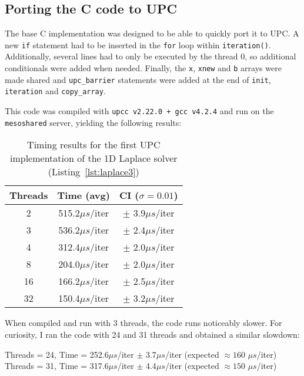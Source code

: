 \documentclass[12pt]{article}
\newcommand{\us}[0]{${\mu}s$}
\begin{document}


\subsection{Porting the C code to UPC}

The base C implementation was designed to be able to quickly port it to UPC.
A new \texttt{if} statement had to be inserted in the \texttt{for} loop within \texttt{iteration()}.
Additionally, several lines had to only be executed by the thread 0, so additional conditionals were added when needed.
Finally, the \texttt{x}, \texttt{xnew} and \texttt{b} arrays were made shared and \texttt{upc\_barrier} statements were added at the end of \texttt{init}, \texttt{iteration} and \texttt{copy\_array}.

This code was compiled with \texttt{upcc v2.22.0 + gcc v4.2.4} and run on the \texttt{mesoshared} server, yielding the following results:

\begin{table}[h]
  \centering\begin{tabular}{|c|c|c|}
    \hline
    Threads & Time (avg) & CI ($\sigma=0.01$) \\
    \hline
    2 & 515.2\us/iter & $\pm$ 3.9\us/iter \\
    3 & 536.2\us/iter & $\pm$ 2.4\us/iter \\
    4 & 312.4\us/iter & $\pm$ 2.0\us/iter \\
    8 & 204.0\us/iter & $\pm$ 2.0\us/iter \\
    16 & 166.2\us/iter & $\pm$ 2.5\us/iter \\
    32 & 150.4\us/iter & $\pm$ 3.2\us/iter \\
    \hline
  \end{tabular}
  \caption{Timing results for the first UPC implementation of the 1D Laplace solver (Listing~\ref{lst:laplace3})}
  \label{tab:laplace3}
\end{table}

When compiled and run with 3 threads, the code runs noticeably slower. For curiosity, I ran the code with 24 and 31 threads and obtained a similar slowdown:

\begin{center}
  Threads = 24, \quad Time = 252.6\us/iter $\pm$ 3.7\us/iter \enspace (expected $\approx 160$ \us/iter) \\
  Threads = 31, \quad Time = 317.6\us/iter $\pm$ 4.4\us/iter \enspace (expected $\approx 150$ \us/iter)
\end{center}
\end{document}

